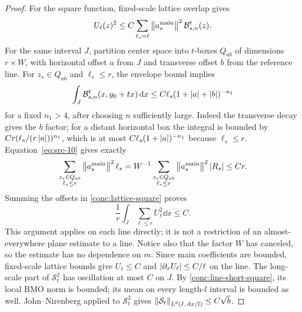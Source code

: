 \begin{proof}
For the square function, fixed-scale lattice overlap gives
\begin{equation}\label{conc:lattice-square}
 U_\ell(z)^2
 \leq C\sum_{\ell_s=\ell}
             \left\|a_s^{\rm main}\right\|^2\mathcal B_{s,n}^{t}(z).
\end{equation}
For the same interval $J$, partition center space into $t$-boxes
$Q_{ab}$ of dimensions $r\times W$, with horizontal offset $a$ from
$J$ and transverse offset $b$ from the reference line.  For
$z_s\in Q_{ab}$ and $\ell_s\leq r$, the envelope bound implies
\[
 \int_J\mathcal B_{s,n}^{t}(x,y_0+tx)\,\mathrm d x
 \leq C\ell_s(1+\left|a\right|+\left|b\right|)^{-n_1}
\]
for a fixed $n_1>4$, after choosing $n$ sufficiently large.
Indeed the transverse decay gives the $b$ factor; for a distant
horizontal box the integral is bounded by
$Cr(\ell_s/(r\left|a\right|))^{n_1}$, which is at most
$C\ell_s(1+\left|a\right|)^{-n_1}$ because $\ell_s\leq r$.
Equation~\eqref{eq:src-10} gives exactly
\[
 \sum_{\substack{z_s\in Q_{ab}\\\ell_s\leq r}}
       \left\|a_s^{\rm main}\right\|^2\ell_s
 =W^{-1}\sum_{\substack{z_s\in Q_{ab}\\\ell_s\leq r}}
       \left\|a_s^{\rm main}\right\|^2\left|R_s\right|\leq Cr.
\]
Summing the offsets in \eqref{conc:lattice-square} proves
\begin{equation}\label{conc:line-short-square}
 \frac1r\int_J\sum_{\ell\leq r}U_\ell^2\dd x\leq C.
\end{equation}
This argument applies on each line directly; it is not a restriction
of an almost-everywhere plane estimate to a line.  Notice also that
the factor $W$ has canceled, so the estimate has no dependence on $m$.
Since main coefficients are bounded, fixed-scale lattice bounds give
$U_\ell\leq C$ and $\left|\partial_x U_\ell\right|\leq C/\ell$ on the line.
The long-scale part of $\mathcal S_t^2$ has oscillation at most $C$ on
$J$.  By \eqref{conc:line-short-square}, its local BMO norm is bounded;
its mean on every length-$l$ interval is bounded as well.
John--Nirenberg applied to $\mathcal S_t^2$ gives
$\left\|\mathcal S_t\right\|_{L^b(I,\,\mathrm d x/l)}\leq C\sqrt b$.


\end{proof}
